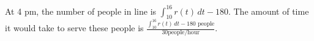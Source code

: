 \documentclass{article}
\begin{document}
\begin{enumerate}
\begin{enumerate}
    \begin{solution} 
      At 4 pm, the number of people in line is $\displaystyle
      \int_{10}^{16} r(t)\,dt - 180$.  The amount of time it would take to
      serve these people is $\boxed{\frac{\displaystyle
      \int_{10}^{16} r(t)\,dt - 180 \text{ people}}{30 \text{
        people/hour}}}$. 
    \end{solution}

  \end{enumerate}










\end{enumerate}
\end{document}
